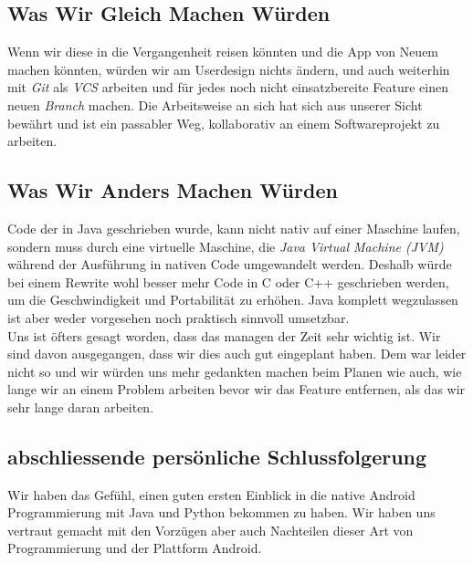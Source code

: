 \documentclass[a4paper,11pt]{article}
\begin{document}
\subsection{Was Wir Gleich Machen Würden}
Wenn wir diese in die Vergangenheit reisen könnten und die App von Neuem machen könnten, würden wir am Userdesign nichts ändern, und auch weiterhin mit \textit{Git} als \textit{VCS} arbeiten und für jedes noch nicht einsatzbereite Feature einen neuen \textit{Branch} machen. Die Arbeitsweise an sich hat sich aus unserer Sicht bewährt und ist ein passabler Weg, kollaborativ an einem Softwareprojekt zu arbeiten.
\subsection{Was Wir Anders Machen Würden}

Code der in Java geschrieben wurde, kann nicht nativ auf einer Maschine laufen, sondern muss durch eine virtuelle Maschine, die \textit{Java Virtual Machine (JVM)} während der Ausführung in nativen Code umgewandelt werden. Deshalb würde bei einem Rewrite wohl besser mehr Code in C oder C++ geschrieben werden, um die Geschwindigkeit und Portabilität zu erhöhen. Java komplett wegzulassen ist aber weder vorgesehen noch praktisch sinnvoll umsetzbar. \\

Uns ist öfters gesagt worden, dass das managen der Zeit sehr wichtig ist. Wir sind davon ausgegangen, dass wir dies auch gut eingeplant haben. Dem war leider nicht so und wir 
würden uns mehr gedankten machen beim Planen wie auch, wie lange wir an einem Problem arbeiten bevor wir das Feature entfernen, als das wir sehr lange daran arbeiten. 


\subsection{abschliessende persönliche Schlussfolgerung}
Wir haben das Gefühl, einen guten ersten Einblick in die native Android Programmierung mit Java und Python bekommen zu haben. Wir haben uns vertraut gemacht mit den Vorzügen aber auch Nachteilen dieser Art von Programmierung und der Plattform Android.\\
\end{document}

